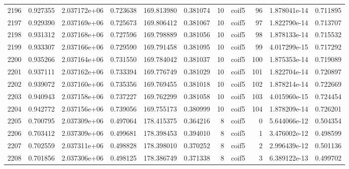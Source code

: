 \begin{tabular}{lrrrrrrlrrr}
2196 &    0.927355 &        2.037172e+06 &  0.723638 &              169.813980 &    0.381074 &      10 &        coif5 &     96 &   1.878041e-14 &      0.711895 \\
2197 &    0.929390 &        2.037169e+06 &  0.725673 &              169.806412 &    0.381067 &      10 &        coif5 &     97 &   1.822790e-14 &      0.713707 \\
2198 &    0.931312 &        2.037168e+06 &  0.727596 &              169.798889 &    0.381056 &      10 &        coif5 &     98 &   1.878133e-14 &      0.715532 \\
2199 &    0.933307 &        2.037166e+06 &  0.729590 &              169.791458 &    0.381095 &      10 &        coif5 &     99 &   4.017299e-15 &      0.717292 \\
2200 &    0.935266 &        2.037164e+06 &  0.731550 &              169.784042 &    0.381037 &      10 &        coif5 &    100 &   1.875353e-14 &      0.719089 \\
2201 &    0.937111 &        2.037162e+06 &  0.733394 &              169.776749 &    0.381029 &      10 &        coif5 &    101 &   1.822704e-14 &      0.720897 \\
2202 &    0.939072 &        2.037160e+06 &  0.735356 &              169.769455 &    0.381018 &      10 &        coif5 &    102 &   1.878214e-14 &      0.722669 \\
2203 &    0.940943 &        2.037158e+06 &  0.737227 &              169.762299 &    0.381058 &      10 &        coif5 &    103 &   4.015960e-15 &      0.724454 \\
2204 &    0.942772 &        2.037156e+06 &  0.739056 &              169.755173 &    0.380999 &      10 &        coif5 &    104 &   1.878209e-14 &      0.726201 \\
2205 &    0.700795 &        2.037309e+06 &  0.497064 &              178.415375 &    0.364216 &       8 &        coif5 &      0 &   5.644066e-12 &      0.504354 \\
2206 &    0.703412 &        2.037309e+06 &  0.499681 &              178.398453 &    0.394010 &       8 &        coif5 &      1 &   3.476002e-12 &      0.498599 \\
2207 &    0.702559 &        2.037311e+06 &  0.498828 &              178.398010 &    0.370252 &       8 &        coif5 &      2 &   2.996439e-12 &      0.501136 \\
2208 &    0.701856 &        2.037306e+06 &  0.498125 &              178.386749 &    0.371338 &       8 &        coif5 &      3 &   6.389122e-13 &      0.499702 \\

\end{tabular}
